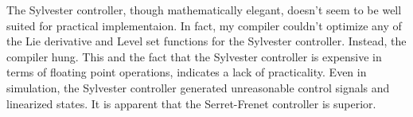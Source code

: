 \documentclass[oneside, 11pt]{book}
\begin{document}
The Sylvester controller, though mathematically elegant, doesn't seem to be well suited for practical implementaion. In fact, my compiler couldn't optimize any of the Lie derivative and Level set functions for the Sylvester controller. Instead, the compiler hung. This and the fact that the Sylvester controller is expensive in terms of floating point operations, indicates a lack of practicality. Even in simulation, the Sylvester controller generated unreasonable control signals and linearized states. It is apparent that the Serret-Frenet controller is superior.

\backmatter
\cleardoublepage
{}
{}
\printbibliography[title=References]

\cleardoublepage
{}
{}
\printindex
\end{document}
